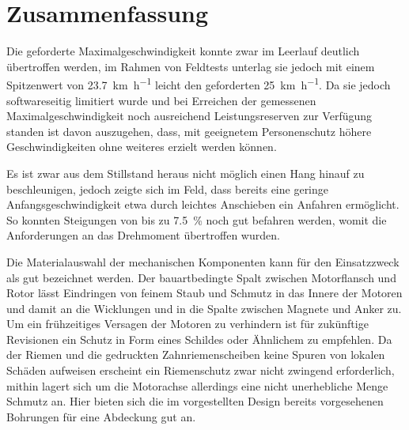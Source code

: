 \chapter{Zusammenfassung}
	Die geforderte Maximalgeschwindigkeit konnte zwar im Leerlauf deutlich übertroffen werden, im Rahmen von Feldtests unterlag sie jedoch mit einem Spitzenwert von \qty{23,7}{\kilo\metre\per\hour} leicht den geforderten \qty{25}{\kilo\metre\per\hour}.
	Da sie jedoch softwareseitig limitiert wurde und bei Erreichen der gemessenen Maximalgeschwindigkeit noch ausreichend Leistungsreserven zur Verfügung standen ist davon auszugehen, dass, mit geeignetem Personenschutz höhere Geschwindigkeiten ohne weiteres erzielt werden können.

	Es ist zwar aus dem Stillstand heraus nicht möglich einen Hang hinauf zu beschleunigen, jedoch zeigte sich im Feld, dass bereits eine geringe Anfangsgeschwindigkeit etwa durch leichtes Anschieben ein Anfahren ermöglicht.
	So konnten Steigungen von bis zu \qty{7,5}{\percent} noch gut befahren werden, womit die Anforderungen an das Drehmoment übertroffen wurden.\par\medskip
	Die Materialauswahl der mechanischen Komponenten kann für den Einsatzzweck als gut bezeichnet werden.
	Der bauartbedingte Spalt zwischen Motorflansch und Rotor lässt Eindringen von feinem Staub und Schmutz in das Innere der Motoren und damit an die Wicklungen und in die Spalte zwischen Magnete und Anker zu.
	Um ein frühzeitiges Versagen der Motoren zu verhindern ist für zukünftige Revisionen ein Schutz in Form eines Schildes oder Ähnlichem zu empfehlen.
	Da der Riemen und die gedruckten Zahnriemenscheiben keine Spuren von lokalen Schäden aufweisen erscheint ein Riemenschutz zwar nicht zwingend erforderlich, mithin lagert sich um die Motorachse allerdings eine nicht unerhebliche Menge Schmutz an.
	Hier bieten sich die im vorgestellten Design bereits vorgesehenen Bohrungen für eine Abdeckung gut an.